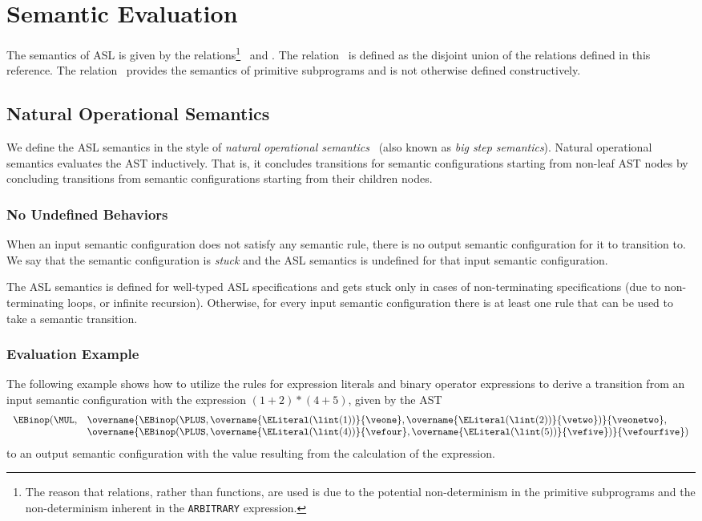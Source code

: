 \section{Semantic Evaluation}
\hypertarget{def-evalrel}{}
\hypertarget{def-primitiverel}{}
The semantics of ASL is given by the relations\footnote{The reason that relations, rather than functions, are used is due to the
potential non-determinism in the primitive subprograms
and the non-determinism inherent in the \texttt{ARBITRARY} expression.}
\evalrel\ and \primitiverel.
The relation \evalrel\ is defined as the disjoint union of the relations defined in this reference.
The relation \primitiverel\ provides the semantics of primitive subprograms and is not otherwise defined
constructively.

\subsection{Natural Operational Semantics}
We define the ASL semantics in the style of \emph{natural operational semantics}~\cite{SemanticsWithApplicationsBook}
(also known as \emph{big step semantics}).
Natural operational semantics evaluates the AST inductively.
That is, it concludes transitions for semantic configurations starting from
non-leaf AST nodes by concluding transitions from semantic configurations starting from their children nodes.

\subsubsection{No Undefined Behaviors}
When an input semantic configuration does not satisfy any semantic rule,
there is no output semantic configuration for it to transition to. We say that
the semantic configuration is \emph{stuck} and the ASL semantics is undefined for that
input semantic configuration.

The ASL semantics is defined for well-typed ASL specifications
and gets stuck only in cases of non-terminating specifications
(due to non-terminating loops, or infinite recursion).
Otherwise, for every input semantic configuration there is at least one rule that can be used to take a semantic transition.

\hypertarget{eval-example}{}
\subsubsection{Evaluation Example}
\newcommand\elint[1]{\ELiteral(\lint(#1))}
The following example shows how to utilize the rules for expression literals and binary operator expressions
to derive a transition from an input semantic configuration with the expression $(1+2)*(4+5)$,
given by the AST
\[
  \begin{array}{rl}
  \EBinop(\MUL, &\overname{\EBinop(\PLUS, \overname{\elint{1}}{\veone}, \overname{\elint{2}}{\vetwo})}{\veonetwo}, \\
                &\overname{\EBinop(\PLUS, \overname{\elint{4}}{\vefour}, \overname{\elint{5}}{\vefive})}{\vefourfive})
  \end{array}
\]
to an output semantic configuration with the value resulting from the calculation of the expression.

